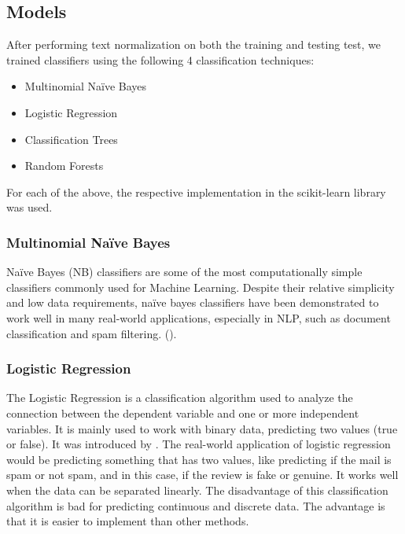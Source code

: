\documentclass[a4paper, 11pt]{article}
\begin{document}
\begin{multicols}{2}

\subsection{Models}

After performing text normalization on both the training and testing test, we trained classifiers using the following 4 classification techniques:
\begin{itemize}
    \item Multinomial Naïve Bayes
    \item Logistic Regression
    \item Classification Trees
    \item Random Forests
\end{itemize}

For each of the above, the respective implementation in the scikit-learn library \cite{scikit-learn} was used. 

\subsubsection{Multinomial Naïve Bayes}
Naïve Bayes (NB) classifiers are some of the most computationally simple classifiers commonly used for Machine Learning. Despite their relative simplicity and low data requirements, naïve bayes classifiers have been demonstrated to work well in many real-world applications, especially in NLP, such as document classification and spam filtering. (\cite{Mccallum1998, Metsis2006}).

\subsubsection{Logistic Regression}
The Logistic Regression is a classification algorithm used to analyze the connection between the dependent variable and one or more independent variables. It is mainly used to work with binary data, predicting two values (true or false). It was introduced by \cite{peng2002introduction}. The real-world application of logistic regression would be predicting something that has two values, like predicting if the mail is spam or not spam, and in this case, if the review is fake or genuine. It works well when the data can be separated linearly. The disadvantage of this classification algorithm is bad for predicting continuous and discrete data. The advantage is that it is easier to implement than other methods.


\end{multicols}
\end{document}
